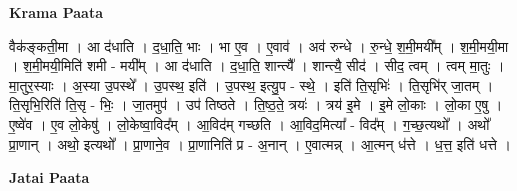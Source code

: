 \documentclass[17pt]{extarticle}
\begin{document}
\textbf{Krama Paata} \newline

वैक॑ङ्कती॒मा । आ द॑धाति । द॒धा॒ति॒ भाः । भा ए॒व । ए॒वाव॑ । अव॑ रुन्धे । रु॒न्धे॒ श॒मी॒मयी᳚म् । 
श॒मी॒मयी॒मा । श॒मी॒मयी॒मिति॑ शमी - मयी᳚म् । आ द॑धाति । द॒धा॒ति॒ शान्त्यै᳚ । शान्त्यै॒ सीद॑ । सीद॒ त्वम् । त्वम् मा॒तुः । मा॒तुर॒स्याः । अ॒स्या उ॒पस्थे᳚ । उ॒पस्थ॒ इति॑ । उ॒पस्थ॒ इत्यु॒प - स्थे॒ । इति॑ ति॒सृभिः॑ । ति॒सृभि॑र् जा॒तम् । ति॒सृभि॒रिति॑ ति॒सृ - भिः॒ । जा॒तमुप॑ । उप॑ तिष्ठते । ति॒ष्ठ॒ते॒ त्रयः॑ । त्रय॑ इ॒मे । इ॒मे लो॒काः । लो॒का ए॒षु । ए॒ष्वे॑व । ए॒व लो॒केषु॑ । लो॒केष्वा॒विद᳚म् । आ॒विद॑म् गच्छति । आ॒विद॒मित्या᳚ - विद᳚म् । ग॒च्छ॒त्यथो᳚ । अथो᳚ प्रा॒णान् । अथो॒ इत्यथो᳚ । प्रा॒णाने॒व । प्रा॒णानिति॑ प्र - अ॒नान् । ए॒वात्मन्न् । आ॒त्मन् ध॑त्ते । ध॒त्त॒ इति॑ धत्ते । \newline

\textbf{Jatai Paata} \newline
\end{document}
